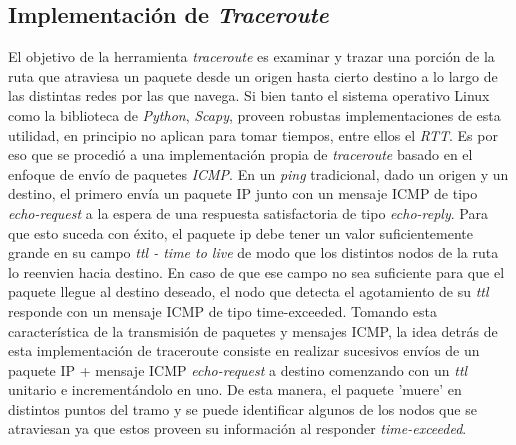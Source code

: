 \subsection{Implementación de \textsl{Traceroute}}

El objetivo de la herramienta \textsl{traceroute} es examinar y trazar una porción de la ruta que atraviesa un paquete desde un origen hasta cierto destino a lo largo de las distintas redes por las que navega. Si bien tanto el sistema operativo Linux como la biblioteca de \textit{Python}, \textsl{Scapy}, proveen robustas implementaciones de esta utilidad, en principio no aplican para tomar tiempos, entre ellos el \textit{RTT}. Es por eso que se procedió a una implementación propia de \textsl{traceroute} basado en el enfoque de envío de paquetes \textit{ICMP}. En un \textit{ping} tradicional, dado un origen y un destino, el primero envía un paquete IP junto con un mensaje ICMP de tipo \textit{echo-request} a la espera de una respuesta satisfactoria de tipo \textit{echo-reply}. Para que esto suceda con éxito, el paquete ip debe tener un valor suficientemente grande en su campo \textit{ttl - time to live} de modo que los distintos nodos de la ruta lo reenvien hacia destino. En caso de que ese campo no sea suficiente para que el paquete llegue al destino deseado, el nodo que detecta el agotamiento de su \textit{ttl} responde con un mensaje ICMP de tipo {time-exceeded}. Tomando esta característica de la transmisión de paquetes y mensajes ICMP, la idea detrás de esta implementación de traceroute consiste en realizar sucesivos envíos de un paquete IP + mensaje ICMP \textit{echo-request} a destino comenzando con un \textit{ttl} unitario e incrementándolo en uno. De esta manera, el paquete 'muere' en distintos puntos del tramo y se puede identificar algunos de los nodos que se atraviesan ya que estos proveen su información al responder \textit{time-exceeded}.\\
